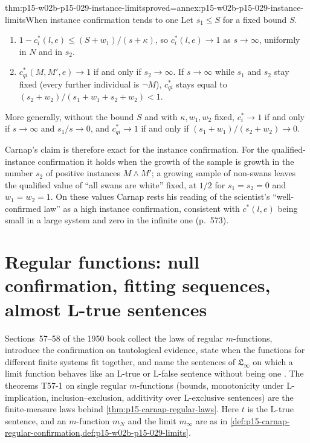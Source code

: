 \begin{hbtheorem}{thm:p15-w02b-p15-029-instance-limits}{proved=annex:p15-w02b-p15-029-instance-limits}{When instance confirmation tends to one}
Let \(s_1\leq S\) for a fixed bound \(S\).
\begin{enumerate}
 \item \(1-c^*_i(l,e)\leq(S+w_1)/(s+\kappa)\), so \(c^*_i(l,e)\to1\)
       as \(s\to\infty\), uniformly in \(N\) and in \(s_2\).
 \item \(c^*_{qi}(M,M',e)\to1\) if and only if \(s_2\to\infty\).
       If \(s\to\infty\) while \(s_1\) and \(s_2\) stay fixed (every
       further individual is \(\neg M\)), \(c^*_{qi}\) stays equal to
       \((s_2+w_2)/(s_1+w_1+s_2+w_2)<1\).
\end{enumerate}
More generally, without the bound \(S\) and with \(\kappa,w_1,w_2\)
fixed, \(c^*_i\to1\) if and only if \(s\to\infty\) and \(s_1/s\to0\), and \(c^*_{qi}\to1\) if and only if
\((s_1+w_1)/(s_2+w_2)\to0\).
\end{hbtheorem}

Carnap's claim is therefore exact for the instance confirmation. For the
qualified-instance confirmation it holds when the growth of the sample
is growth in the number \(s_2\) of positive instances \(M\land M'\); a
growing sample of non-swans leaves the qualified value of
``all swans are white'' fixed, at \(1/2\) for \(s_1=s_2=0\) and
\(w_1=w_2=1\). On these values Carnap rests his reading of the
scientist's ``well-confirmed law'' as a high instance confirmation,
consistent with \(c^*(l,e)\) being small in a large system and zero in
the infinite one (p.~573).

\section{Regular functions: null confirmation, fitting sequences, almost L-true sentences}
\label{sec:p15-w02b-p15-029-regular}

Sections~57--58 of the 1950 book collect the laws of regular
\(m\)-functions, introduce the confirmation on tautological evidence,
state when the functions for different finite systems fit together, and
name the sentences of \(\mathfrak L_\infty\) on which a limit function
behaves like an L-true or L-false sentence without being one
\cite[secs.~57--58, pp.~305--315]{Carnap1950Probability}. The theorems
T57-1 on single regular \(m\)-functions (bounds, monotonicity under
L-implication, inclusion--exclusion, additivity over L-exclusive
sentences) are the finite-measure laws behind
\cref{thm:p15-carnap-regular-laws}. Here \(t\) is the L-true
sentence, and an \(m\)-function \(m_N\) and the limit \(m_\infty\) are
as in \cref{def:p15-carnap-regular-confirmation,def:p15-w02b-p15-029-limits}.

